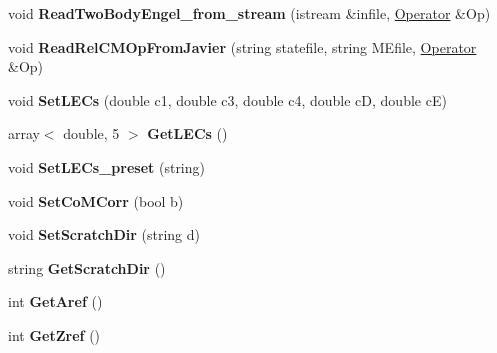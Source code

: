 \begin{DoxyCompactItemize}
\item 
void {\bfseries Read\+Two\+Body\+Engel\+\_\+from\+\_\+stream} (istream \&infile, \hyperlink{classOperator}{Operator} \&Op)\hypertarget{classReadWrite_a7bc3e52488d9c68eff73e7fdf21c2902}{}\label{classReadWrite_a7bc3e52488d9c68eff73e7fdf21c2902}

\item 
void {\bfseries Read\+Rel\+C\+M\+Op\+From\+Javier} (string statefile, string M\+Efile, \hyperlink{classOperator}{Operator} \&Op)\hypertarget{classReadWrite_adc83e4b1e3c72197b3f4e8058253614d}{}\label{classReadWrite_adc83e4b1e3c72197b3f4e8058253614d}

\item 
void {\bfseries Set\+L\+E\+Cs} (double c1, double c3, double c4, double cD, double cE)\hypertarget{classReadWrite_a10180e94275661120691d68111df58ad}{}\label{classReadWrite_a10180e94275661120691d68111df58ad}

\item 
array$<$ double, 5 $>$ {\bfseries Get\+L\+E\+Cs} ()\hypertarget{classReadWrite_a5d8d1131eddbf866c0003fa622e0e165}{}\label{classReadWrite_a5d8d1131eddbf866c0003fa622e0e165}

\item 
void {\bfseries Set\+L\+E\+Cs\+\_\+preset} (string)\hypertarget{classReadWrite_a537f1835dd4d3d4b25f0a270d8a0984c}{}\label{classReadWrite_a537f1835dd4d3d4b25f0a270d8a0984c}

\item 
void {\bfseries Set\+Co\+M\+Corr} (bool b)\hypertarget{classReadWrite_a5e81dd4ce4adfe6fc08af81440003bb9}{}\label{classReadWrite_a5e81dd4ce4adfe6fc08af81440003bb9}

\item 
void {\bfseries Set\+Scratch\+Dir} (string d)\hypertarget{classReadWrite_abf0fa3edb152641818ee7537d833b205}{}\label{classReadWrite_abf0fa3edb152641818ee7537d833b205}

\item 
string {\bfseries Get\+Scratch\+Dir} ()\hypertarget{classReadWrite_a659b8202dcff2b65dd3891670bf46b41}{}\label{classReadWrite_a659b8202dcff2b65dd3891670bf46b41}

\item 
int {\bfseries Get\+Aref} ()\hypertarget{classReadWrite_ab9af15a14bfb94d7be2fbc277271c2ce}{}\label{classReadWrite_ab9af15a14bfb94d7be2fbc277271c2ce}

\item 
int {\bfseries Get\+Zref} ()\hypertarget{classReadWrite_ab99d6e06793182659ef36b5f051e4284}{}\label{classReadWrite_ab99d6e06793182659ef36b5f051e4284}


\end{DoxyCompactItemize}
